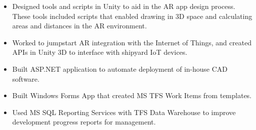 \documentclass[10pt,a4paper]{altacv}
\begin{document}
\divider

\begin{itemize}
\item Designed tools and scripts in Unity to aid in the AR app design process. These tools included scripts that enabled drawing in 3D space and calculating areas and distances in the AR environment.
\item Worked to jumpstart AR integration with the Internet of Things, and created APIs in Unity 3D to interface with shipyard IoT devices.
\end{itemize}

\divider


\begin{itemize}
\item Built ASP.NET application to automate deployment of in-house CAD software.
\item Built Windows Forms App that created MS TFS Work Items from templates.
\item Used MS SQL Reporting Services with TFS Data Warehouse to improve development progress reports for management.
\end{itemize}




\clearpage
\end{document}
